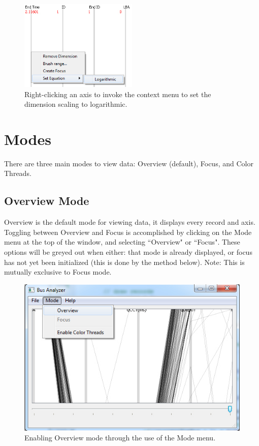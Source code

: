 \documentclass[12pt]{ucthesis}
\begin{document}
\begin{figure}[htb!]
 \centering
 \includegraphics[width=0.5\textwidth]{images/documentation/set_logarithmic.jpg}
 \caption[Right-clicking an axis to set the dimension scaling to logarithmic.]{Right-clicking an axis to invoke the context menu to set the dimension scaling to logarithmic.}
 \label{fig:doc}
\end{figure}

\section{Modes}
There are three main modes to view data: Overview (default), Focus, and Color Threads.

\subsection{Overview Mode}
Overview is the default mode for viewing data, it displays every record and axis. Toggling between Overview and Focus is accomplished by clicking on the Mode menu at the top of the window, and selecting ``Overview" or ``Focus". These options will be greyed out when either: that mode is already displayed, or focus has not yet been initialized (this is done by the method below). Note: This is mutually exclusive to Focus mode.

\begin{figure}[htb!]
 \centering
 \includegraphics[width=\textwidth]{images/documentation/enable_overview.jpg}
 \caption[Enabling Overview mode through the use of the Mode menu.]{Enabling Overview mode through the use of the Mode menu.}
 \label{fig:doc}
\end{figure}
\end{document}
